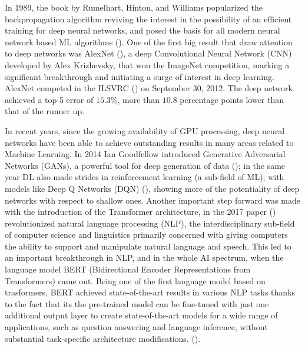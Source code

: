 \documentclass[binding=0.6cm]{sapthesis}
\newcommand{\mycite}[1]{(\cite{#1})}
\begin{document}
In 1989, the book  by Rumelhart, Hinton, and Williams popularized the backpropagation algorithm reviving the interest in the possibility of an efficient training for deep neural networks, and posed the basis for all modern neural network based ML algorithms \mycite{rumelhart-hinton-1989}. One of the first big result that draw attention to deep networks was AlexNet \mycite{krizhevsky2012-nips}, a deep Convolutional Neural Network (CNN) developed by Alex Krizhevsky, that won the ImageNet competition, marking a significant breakthrough and initiating a surge of interest in deep learning. AlexNet competed in the ILSVRC \mycite{ILSVRC15} on September 30, 2012. The deep network achieved a top-5 error of $15.3\%$, more than $10.8$ percentage points lower than that of the runner up. 

In recent years, since the growing availability of GPU processing, deep neural networks have been able to achieve outstanding results in many areas related to Machine Learning. In 2014 Ian Goodfellow introduced Generative Adversarial Networks (GANs), a powerful tool for deep generation of data \mycite{goodfellow2014-GANs}; in the same year DL also made strides in reinforcement learning (a sub-field of ML), with models like Deep Q Networks (DQN) \mycite{Mnih2015-HumanlevelCT}, showing more of the potentiality of deep networks with respect to shallow ones. Another important step forward was made with the introduction of the Transformer architecture, in the 2017 paper  \mycite{vaswani2017-attention} revolutionized natural language processing (NLP), the interdisciplinary sub-field of computer science and linguistics primarily concerned with giving computers the ability to support and manipulate natural language and speech. This led to an important breakthrough in NLP, and in the whole AI spectrum, when the language model BERT (Bidirectional Encoder Representations from Transformers) came out. Being one of the first language model based on trasformers, BERT achieved state-of-the-art results in various NLP tasks thanks to the fact that its the pre-trained model can be fine-tuned with just one additional output layer to create state-of-the-art models for a wide range of applications, such as question answering and language inference, without substantial task-specific architecture modifications.  \mycite{devlin2018-bert}.
\end{document}
